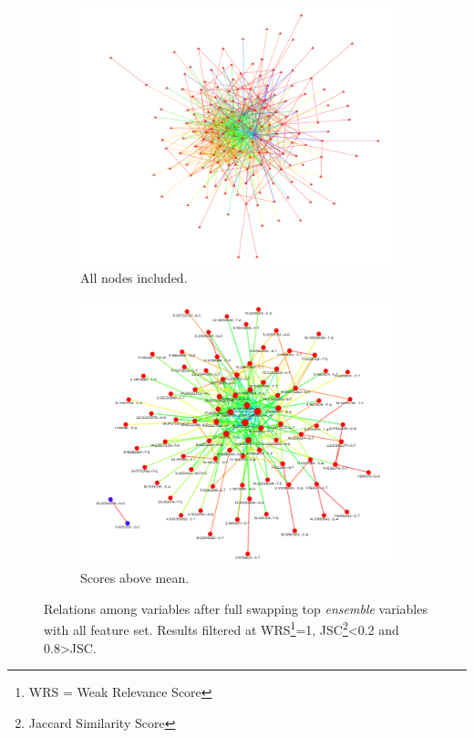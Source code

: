 \begin{figure}[!hp]
	\centering
	\captionsetup{justification=centering}
	\begin{subfigure}[b]{0.45\linewidth}
		\includegraphics[width=\linewidth]{Major Thesis/figures/graphs/dt2_ssc0.2_0.8ssc.png}
		\caption{All nodes included.}
	\end{subfigure}
	\hfill
	\begin{subfigure}[b]{0.45\linewidth}
		\includegraphics[width=\linewidth]{Major Thesis/figures/graphs/dt2_ssc0.2_0.8ssc_mean.png}
		\caption{Scores above mean.}
	\end{subfigure}
	\caption{Relations among variables after full swapping top \emph{ensemble} variables with all feature set. Results filtered at WRS\footnote{WRS = Weak Relevance Score}=1, JSC\footnote{Jaccard Similarity Score}<0.2 and 0.8>JSC.}
    \label{fig:dt2-trimmed}
\end{figure}